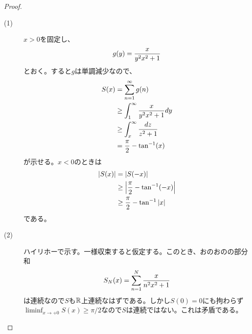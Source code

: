 \subsubsection{}%
\begin{proof} ${}$
  \begin{description}
    \item[(1)] $x > 0$を固定し、
    \[
    g(y) = \frac{x}{y^2 x^2 + 1}
    \]
    とおく。すると$g$は単調減少なので、
    \begin{align*}
      S(x) &= \sum_{n=1}^{\infty} g(n) \\
      &\geq \int_1^{\infty} \frac{x}{y^2 x^2 + 1} dy \\
&\geq \int_x^{\infty} \frac{dz}{z^2 + 1} \\
&= \frac{\pi}{2} - \tan^{-1}(x)
    \end{align*}
    が示せる。$x < 0$のときは
    \begin{align*}
      \left \lvert S(x) \right \rvert &= \left \lvert S(-x) \right \rvert \\
      &\geq \left \lvert  \frac{\pi}{2} - \tan^{-1}(-x)  \right \rvert \\
      &\geq \frac{\pi}{2} - \tan^{-1} \left \lvert x \right \rvert
    \end{align*}
    である。
    \item[(2)] ハイリホーで示す。一様収束すると仮定する。このとき、おのおのの部分和
    \[
    S_N(x) = \sum_{n=1}^{N} \frac{x}{n^2 x^2 + 1}
    \]
    は連続なので$S$も${\mathbb R}$上連続なはずである。しかし$S(0) = 0$にも拘わらず$\liminf_{x \to + 0} S(x) \geq \pi /2 $なので$S$は連続ではない。これは矛盾である。
  \end{description}
\end{proof}

\newpage


